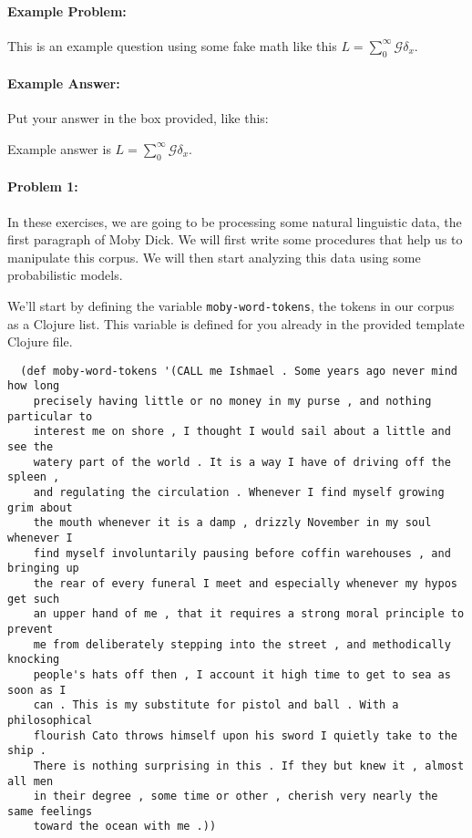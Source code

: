 \documentclass[10pt]{article}
\newenvironment{AnswerBox}{\begin{mdframed}[style=simple]}{\end{mdframed}}
\begin{document}
\hrulefill %

\paragraph{Example Problem:}
This is an example question using some fake math like this
$L=\sum_0^{\infty} \mathcal{G} \delta_x$.

\paragraph{Example Answer:} Put your answer in the box provided, like this:
\begin{AnswerBox}
Example answer is $L=\sum_0^{\infty} \mathcal{G} \delta_x$.
\end{AnswerBox}


\hrulefill%

\pagebreak%

\paragraph{Problem 1:}

In these exercises, we are going to be processing some natural linguistic data,
the first paragraph of Moby Dick. We will first write some procedures that help
us to manipulate this corpus. We will then start analyzing this data using some
probabilistic models.

We'll start by defining the variable \texttt{moby-word-tokens}, the tokens in
our corpus as a Clojure list. This variable is defined for you already in
the provided template Clojure file.

\begin{lstlisting}
  (def moby-word-tokens '(CALL me Ishmael . Some years ago never mind how long
    precisely having little or no money in my purse , and nothing particular to
    interest me on shore , I thought I would sail about a little and see the
    watery part of the world . It is a way I have of driving off the spleen ,
    and regulating the circulation . Whenever I find myself growing grim about
    the mouth whenever it is a damp , drizzly November in my soul whenever I
    find myself involuntarily pausing before coffin warehouses , and bringing up
    the rear of every funeral I meet and especially whenever my hypos get such
    an upper hand of me , that it requires a strong moral principle to prevent
    me from deliberately stepping into the street , and methodically knocking
    people's hats off then , I account it high time to get to sea as soon as I
    can . This is my substitute for pistol and ball . With a philosophical
    flourish Cato throws himself upon his sword I quietly take to the ship .
    There is nothing surprising in this . If they but knew it , almost all men
    in their degree , some time or other , cherish very nearly the same feelings
    toward the ocean with me .))
\end{lstlisting}
\end{document}
